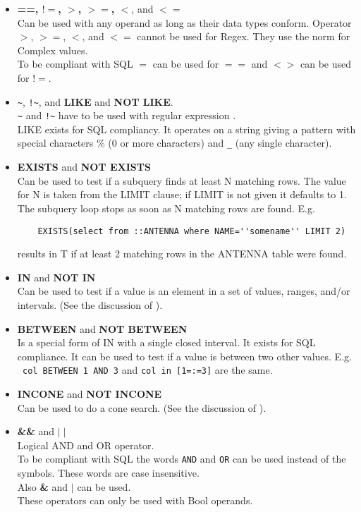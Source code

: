 \begin{itemize}
  \item \textbf{==, $!=$, $>$, $>=$, $<$}, and \textbf{$<=$}
       \\Can be used with any operand as long as their data types conform.
       Operator $>$, $>=$, $<$, and $<=$ cannot be used for Regex.
       They use the norm for Complex values.
       \\To be compliant with SQL $=$ can be used for
       $==$ and $<>$ can be used for $!=$.
  \item \verb+~+, \verb+!~+, and \textbf{LIKE} and
          \textbf{NOT LIKE}.
       \\\verb+~+ and \verb+!~+ have to be used with regular expression
       .
       \\LIKE exists for SQL compliancy. It operates on a string
       giving a pattern with special characters \% (0 or more
       characters) and \verb+_+ (any single character). 
  \item \textbf{EXISTS} and \textbf{NOT EXISTS}
       \\Can be used to test if a subquery finds at least N matching rows.
       The value for N is taken from the LIMIT clause; if LIMIT is
       not given it defaults to 1. The subquery loop stops as soon as
       N matching rows are found.
       E.g.
       \begin{verbatim}
    EXISTS(select from ::ANTENNA where NAME=''somename'' LIMIT 2)
       \end{verbatim}
       results in T if at least 2 matching rows in the ANTENNA table
       were found.
  \item \textbf{IN} and \textbf{NOT IN}
       \\Can be used to test if a value is an element in a set of
       values, ranges, and/or intervals.
       (See the discussion of ).
  \item \textbf{BETWEEN} and \textbf{NOT BETWEEN}
       \\Is a special form of IN with a single closed interval.
       It exists for SQL compliance.
       It can be used to test if a value is between two other values.
       E.g.
       \\\texttt{   col BETWEEN 1 AND 3}  and  \texttt{col in [1=:=3]}
       are the same.
  \item \textbf{INCONE} and \textbf{NOT INCONE}
       \\Can be used to do a cone search.
       (See the discussion of
       ).
  \item \textbf{\&\&} and \textbf{$\mid\mid$}
       \\Logical AND and OR operator. 
       \\To be compliant with SQL the
       words \texttt{AND} and \texttt{OR} can be used instead of the
       symbols. These words are case insensitive.
       \\Also \textbf{\&} and \textbf{$\mid$} can be used.
       \\These operators can only be used with Bool operands.
\end{itemize}
